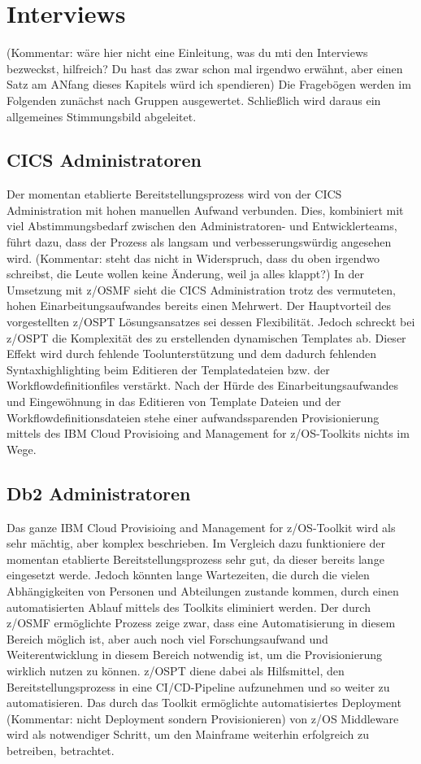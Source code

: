 \section{Interviews}
(Kommentar: wäre hier nicht eine Einleitung, was du mti den Interviews bezweckst, hilfreich? Du hast das zwar schon mal irgendwo erwähnt, aber einen Satz am ANfang dieses Kapitels würd ich spendieren) 
Die Fragebögen werden im Folgenden zunächst nach Gruppen ausgewertet.
Schließlich wird daraus ein allgemeines Stimmungsbild abgeleitet.

\subsection{CICS Administratoren}
Der momentan etablierte Bereitstellungsprozess wird von der CICS Administration mit hohen manuellen Aufwand verbunden.
Dies, kombiniert mit viel Abstimmungsbedarf zwischen den Administratoren- und Entwicklerteams, führt dazu, dass der Prozess als langsam und verbesserungswürdig angesehen wird. (Kommentar: steht das nicht in Widerspruch, dass du oben irgendwo schreibst, die Leute wollen keine Änderung, weil ja alles klappt?)
In der Umsetzung mit z/OSMF sieht die CICS Administration trotz des vermuteten, hohen Einarbeitungsaufwandes bereits einen Mehrwert.
Der Hauptvorteil des vorgestellten z/OSPT Lösungsansatzes sei dessen Flexibilität.
Jedoch schreckt bei z/OSPT die Komplexität des zu erstellenden dynamischen Templates ab.
Dieser Effekt wird durch fehlende Toolunterstützung und dem dadurch fehlenden Syntaxhighlighting beim Editieren der Templatedateien bzw. der Workflowdefinitionfiles verstärkt.
Nach der Hürde des Einarbeitungsaufwandes und Eingewöhnung in das Editieren von Template Dateien und der Workflowdefinitionsdateien stehe einer aufwandssparenden Provisionierung mittels des \glqq IBM Cloud Provisioing and Management for z/OS\grqq-Toolkits nichts im Wege.

\subsection{Db2 Administratoren}
Das ganze \glqq IBM Cloud Provisioing and Management for z/OS\grqq-Toolkit wird als sehr mächtig, aber komplex beschrieben.
Im Vergleich dazu funktioniere der momentan etablierte Bereitstellungsprozess sehr gut, da dieser bereits lange eingesetzt werde.
Jedoch könnten lange Wartezeiten, die durch die vielen Abhängigkeiten von Personen und Abteilungen zustande kommen, durch einen automatisierten Ablauf mittels des Toolkits eliminiert werden.
Der durch z/OSMF ermöglichte Prozess zeige zwar, dass eine Automatisierung in diesem Bereich möglich ist, aber auch noch viel Forschungsaufwand und Weiterentwicklung in diesem Bereich notwendig ist, um die Provisionierung wirklich nutzen zu können.
z/OSPT diene dabei als Hilfsmittel, den Bereitstellungsprozess in eine CI/CD-Pipeline aufzunehmen und so weiter zu automatisieren.
Das durch das Toolkit ermöglichte automatisiertes Deployment (Kommentar: nicht Deployment sondern Provisionieren) von z/OS Middleware wird als notwendiger Schritt, um den Mainframe weiterhin erfolgreich zu betreiben, betrachtet.

